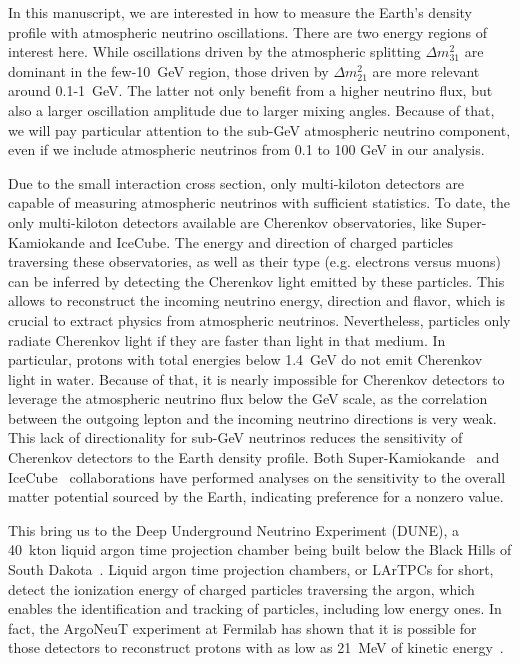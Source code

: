 In this manuscript, we are interested in how to measure the Earth's density profile with atmospheric neutrino oscillations. 
There are two energy regions of interest here.
While oscillations driven by the atmospheric splitting $\Delta m^2_{31}$ are dominant in the few-10~GeV region, those driven by $\Delta m^2_{21}$ are more relevant around 0.1-1~GeV.
The latter not only benefit from a higher neutrino flux, but also a larger oscillation amplitude due to larger mixing angles.
Because of that, we will pay particular attention to the sub-GeV atmospheric neutrino component, even if we include atmospheric neutrinos from 0.1 to 100 GeV in our analysis.

Due to the small interaction cross section, only multi-kiloton detectors are capable of measuring atmospheric neutrinos with sufficient statistics.
To date, the only multi-kiloton detectors available are Cherenkov observatories, like Super-Kamiokande and IceCube. 
The energy and direction of charged particles traversing these observatories, as well as their type (e.g. electrons versus muons) can be inferred  by  detecting the Cherenkov light emitted by these particles.
This allows to reconstruct the incoming neutrino energy, direction and flavor, which is crucial to extract physics from atmospheric neutrinos.
Nevertheless, particles only radiate Cherenkov light if they are faster than light in that medium. 
In particular, protons with total energies below 1.4~GeV do not emit Cherenkov light in water.
Because of that, it is nearly impossible for Cherenkov detectors to leverage the atmospheric neutrino flux below the GeV scale, as the correlation between the outgoing lepton and the incoming neutrino directions is very weak. 
This lack of directionality for sub-GeV neutrinos reduces the sensitivity of Cherenkov detectors  to the Earth density profile. 
Both Super-Kamiokande~\cite{Super-Kamiokande:2017yvm} and IceCube~\cite{IceCube:2019dyb} collaborations have performed analyses on the sensitivity to the overall matter potential sourced by the Earth, indicating preference for a nonzero value.

This bring us to the Deep Underground Neutrino Experiment (DUNE), a 40~kton liquid argon time projection chamber being built below the Black Hills of South Dakota~\cite{DUNE:2020lwj, DUNE:2020ypp}. 
Liquid argon time projection chambers, or LArTPCs for short, detect the ionization energy of charged particles traversing the argon, which enables the identification and tracking of particles, including low energy ones.
In fact, the ArgoNeuT experiment at Fermilab has shown that it is possible for those detectors to reconstruct protons with as low as 21~MeV of kinetic energy~\cite{ArgoNeuT:2018tvi}.

